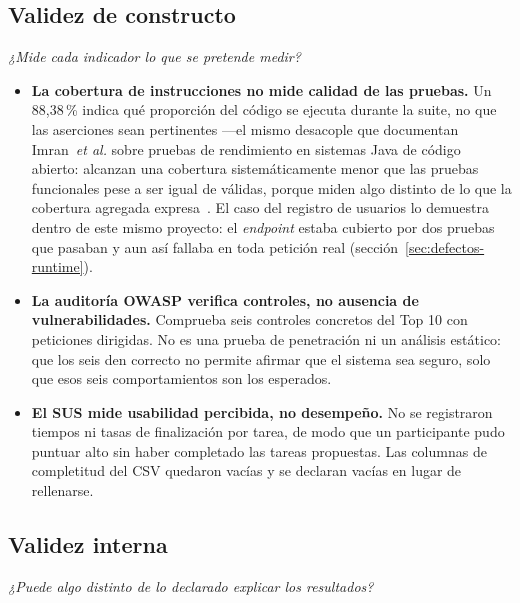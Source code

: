 \documentclass[11pt,a4paper]{article}
\begin{document}
\subsection{Validez de constructo}

\emph{¿Mide cada indicador lo que se pretende medir?}

\begin{itemize}[leftmargin=*]
  \item \textbf{La cobertura de instrucciones no mide calidad de las
    pruebas.} Un 88,38\,\% indica qué proporción del código se ejecuta
    durante la suite, no que las aserciones sean pertinentes —el mismo
    desacople que documentan Imran~\emph{et al.} sobre pruebas de
    rendimiento en sistemas Java de código abierto: alcanzan una
    cobertura sistemáticamente menor que las pruebas funcionales pese a
    ser igual de válidas, porque miden algo distinto de lo que la
    cobertura agregada expresa~\cite{imran2025coverage}. El caso del
    registro de usuarios lo demuestra dentro de este mismo proyecto: el
    \emph{endpoint} estaba cubierto por dos pruebas que pasaban y aun así
    fallaba en toda petición real (sección~\ref{sec:defectos-runtime}).
  \item \textbf{La auditoría OWASP verifica controles, no ausencia de
    vulnerabilidades.} Comprueba seis controles concretos del Top 10 con
    peticiones dirigidas. No es una prueba de penetración ni un análisis
    estático: que los seis den correcto no permite afirmar que el sistema
    sea seguro, solo que esos seis comportamientos son los esperados.
  \item \textbf{El SUS mide usabilidad percibida, no desempeño.} No se
    registraron tiempos ni tasas de finalización por tarea, de modo que un
    participante pudo puntuar alto sin haber completado las tareas
    propuestas. Las columnas de completitud del CSV quedaron vacías y se
    declaran vacías en lugar de rellenarse.
\end{itemize}

\subsection{Validez interna}

\emph{¿Puede algo distinto de lo declarado explicar los resultados?}
\end{document}
